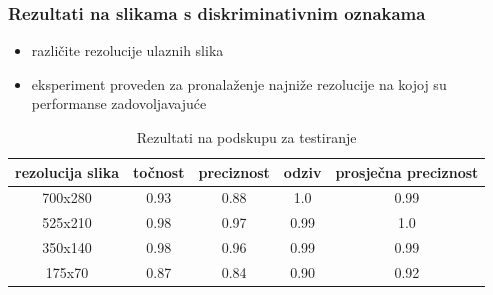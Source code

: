 \documentclass{beamer}
\begin{document}
\begin{frame}
 \frametitle{Rezultati na slikama s diskriminativnim oznakama}
 \begin{itemize}
  \item različite rezolucije ulaznih slika
  \item eksperiment proveden za pronalaženje najniže rezolucije na kojoj su performanse zadovoljavajuće
 \end{itemize}
 
 \begin{table}[H]
\centering
\caption{Rezultati na podskupu za testiranje}
\label{score:single_hand_test_resolutions}
\begin{tabular}{|c|c|c|c|c|}
\hline
rezolucija slika & točnost & preciznost & odziv & prosječna preciznost \\ \hline
700x280          &     0.93    &   0.88         &   1.0    &       0.99               \\ \hline
525x210          &    0.98     &    0.97        &   0.99    &       1.0               \\ \hline
350x140          &     0.98    &    0.96        &   0.99    &        0.99              \\ \hline
175x70           &    0.87     &    0.84        &   0.90    &      0.92                \\ \hline
\end{tabular}
\end{table}

\end{frame}
\end{document}

